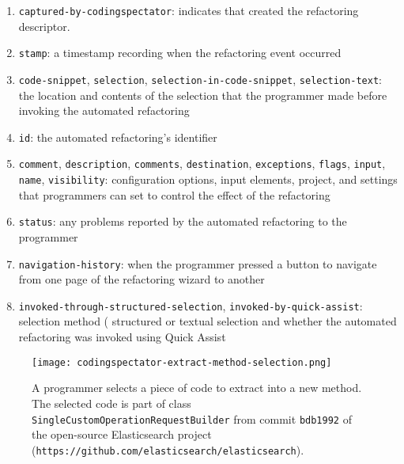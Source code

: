 \begin{enumerate}

\item \texttt{captured-by-codingspectator}: indicates that \CodingSpectator{}
  created the refactoring descriptor.

\item \texttt{stamp}: a timestamp recording when the refactoring event occurred

\item \texttt{code-snippet}, \texttt{selection},
  \texttt{selection-in-code-snippet}, \texttt{selection-text}: the location and
  contents of the selection that the programmer made before invoking the
  automated refactoring

\item \texttt{id}: the automated refactoring's identifier

\item \texttt{comment}, \texttt{description}, \texttt{comments},
  \texttt{destination}, \texttt{exceptions}, \texttt{flags}, \texttt{input},
  \texttt{name}, \texttt{visibility}: configuration options, \eg{} input
  elements, project, and settings that programmers can set to control the effect
  of the refactoring

\item \texttt{status}: any problems reported by the automated refactoring to the
  programmer

\item \texttt{navigation-history}: when the programmer pressed a button to
  navigate from one page of the refactoring wizard to another

\item \texttt{invoked-through-structured-selection},
  \texttt{invoked-by-quick-assist}: selection method (\eg{} structured or
  textual selection and whether the automated refactoring was invoked using
  Quick Assist

\end{enumerate}

\begin{figure}
%
\centering
%
\texttt{[image: codingspectator-extract-method-selection.png]}
%
\caption{\label{FigCodingSpectatorExtractMethodSelectionExample}A programmer
selects a piece of code to extract into a new method. The selected code is part
of class \texttt{SingleCustomOperationRequestBuilder} from commit
\texttt{bdb1992} of the open-source Elasticsearch project
(\texttt{https://github.com/elasticsearch/elasticsearch}).}
%
\end{figure}

